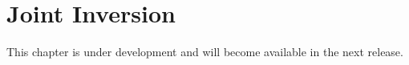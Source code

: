 \chapter{Joint Inversion}\label{Chp:cook:joint inversion}
This chapter is under development and will become available in the next release.